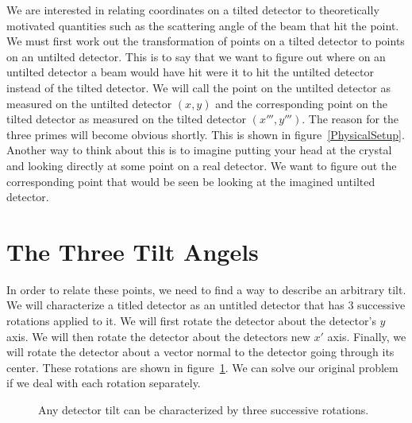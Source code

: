 We are interested in relating
coordinates on a tilted detector 
to theoretically motivated quantities such as 
the scattering angle of the beam that hit the
point. We must first work
out the transformation of points on a tilted detector
to points on an untilted detector. This is to say
that we want to figure out where on an untilted 
detector a beam would have hit were it to hit
the untilted detector instead of the tilted detector.
We will call the point on the untilted detector
as measured on the untilted detector $(x,y)$ 
and the corresponding point on the tilted detector
as measured on the tilted detector $(x''',y''')$. 
The reason for the three primes will become obvious
shortly. This is shown in 
figure~\ref{PhysicalSetup}. Another way to think
about this is to imagine putting your 
head at the crystal and looking directly 
at some point on a real
detector. We want to figure out
the corresponding point that would be seen be looking
at the imagined untilted detector.

\begin{SCfigure}[1][bthp]
    \centering
    
    \caption{The detector 
    is titled with respect to the 
    incoming beam. We are interested in relating
    the point on the tilted detector $(x''',y''')$ to the
    point $(x,y)$ on the imagined untilted detector.}
    \label{PhysicalSetup}
\end{SCfigure}

\section{The Three Tilt Angels}
\index{$\alpha$} \index{$\beta$}  
In order to relate these points, we need to find a way to 
describe an arbitrary tilt. We will 
characterize a titled detector as an untitled detector
that has 3 successive rotations applied to it. 
We will first rotate the detector about the detector's $y$
axis. We will then rotate the detector about the detectors
new $x'$ axis. Finally, we will rotate the detector about
a vector normal to the detector going through its center.
These rotations are shown in figure~\ref{ThreeTilts}.
We can solve our original problem if we deal
with each rotation separately.

\begin{figure}[htb]
    \centering
    \hspace{1em}
    \hspace{1em}
    \caption{Any detector tilt can be characterized 
    by three successive rotations.}
    \label{ThreeTilts}
\end{figure}

